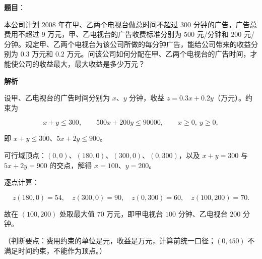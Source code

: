 \begin{answer}

\textbf{题目}：

本公司计划 $2008$ 年在甲、乙两个电视台做总时间不超过 $300$ 分钟的广告，广告总费用不超过 $9$ 万元，甲、乙电视台的广告收费标准分别为 $500$ 元/分钟和 $200$ 元/分钟。规定甲、乙两个电视台为该公司所做的每分钟广告，能给公司带来的收益分别为 $0.3$ 万元和 $0.2$ 万元。问该公司如何分配在甲、乙两个电视台的广告时间，才能使公司的收益最大，最大收益是多少万元？

\textbf{解析}

设甲、乙电视台的广告时间分别为 $x$、$y$ 分钟，收益 $z=0.3x+0.2y$（万元）。约束为

\nopagebreak[4]
\[x+y\leqslant300,\qquad 500x+200y\leqslant90000,\qquad x\geqslant0,\ y\geqslant0,\]

即 $x+y\leqslant300$、$5x+2y\leqslant900$。

可行域顶点：$(0,0)$、$(180,0)$、$(300,0)$、$(0,300)$，以及 $x+y=300$ 与 $5x+2y=900$ 的交点，解得 $x=100$、$y=200$。

逐点计算：

\nopagebreak[4]
\[z(180,0)=54,\quad z(300,0)=90,\quad z(0,300)=60,\quad z(100,200)=70.\]

故在 $(100,200)$ 处取最大值 $70$ 万元，即甲电视台 $100$ 分钟、乙电视台 $200$ 分钟。

（判断要点：费用约束的单位是元，收益是万元，计算前统一口径；$(0,450)$ 不满足时间约束，不能作为顶点。）


\end{answer}
